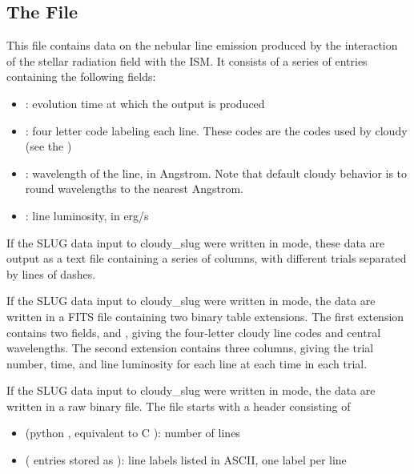 \documentclass[letterpaper,10pt,english]{sphinxmanual}
\begin{document}
\subsection{The  File}
\label{\detokenize{cloudy:the-integrated-cloudylines-file}}
This file contains data on the nebular line emission produced by the
interaction of the stellar radiation field with the ISM. It consists
of a series of entries containing the following fields:
\begin{itemize}
\item {} 
: evolution time at which the output is produced

\item {} 
: four letter code labeling each line. These codes
are the codes used by cloudy (see the )

\item {} 
: wavelength of the line, in Angstrom. Note that
default cloudy behavior is to round wavelengths to the nearest
Angstrom.

\item {} 
: line luminosity, in erg/s

\end{itemize}

If the SLUG data input to cloudy\_slug were written in  mode,
these data are output as a text file containing a series of columns,
with different trials separated by lines of dashes.

If the SLUG data input to cloudy\_slug were written in  mode,
the data are written in a FITS file containing two binary table
extensions. The first extension contains two fields,  and
, giving the four-letter cloudy line codes and central
wavelengths. The second extension contains three columns, giving the
trial number, time, and line luminosity for each line at each time in
each trial.

If the SLUG data input to cloudy\_slug were written in  mode,
the data are written in a raw binary file. The file starts with a
header consisting of
\begin{itemize}
\item {} 
 (python , equivalent to C ): number of lines

\item {} 
 ( entries stored as ): line
labels listed in ASCII, one label per line

\end{itemize}
\end{document}
